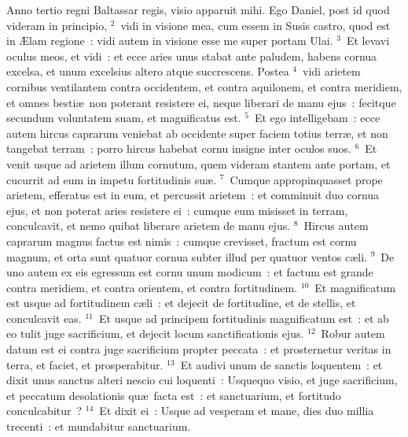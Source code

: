 \bchapter
\lettrine[lines=3,image=true,loversize=0.05,lraise=-0.03]{A}{}nno tertio regni Baltassar regis, visio apparuit mihi. Ego Daniel, post id quod videram in principio,
${}^{2}$~vidi in visione mea, cum essem in Susis castro, quod est in \AE lam regione~: vidi autem in visione esse me super portam Ulai.
${}^{3}$~Et levavi oculus meos, et vidi~: et ecce aries unus stabat ante paludem, habens cornua excelsa, et unum excelsius altero atque succrescens. Postea
${}^{4}$~vidi arietem cornibus ventilantem contra occidentem, et contra aquilonem, et contra meridiem, et omnes besti\ae\ non poterant resistere ei, neque liberari de manu ejus~: fecitque secundum voluntatem suam, et magnificatus est.
${}^{5}$~Et ego intelligebam~: ecce autem hircus caprarum veniebat ab occidente super faciem totius terr\ae , et non tangebat terram~: porro hircus habebat cornu insigne inter oculos suos.
${}^{6}$~Et venit usque ad arietem illum cornutum, quem videram stantem ante portam, et cucurrit ad eum in impetu fortitudinis su\ae .
${}^{7}$~Cumque appropinquasset prope arietem, efferatus est in eum, et percussit arietem~: et comminuit duo cornua ejus, et non poterat aries resistere ei~: cumque eum misisset in terram, conculcavit, et nemo quibat liberare arietem de manu ejus.
${}^{8}$~Hircus autem caprarum magnus factus est nimis~: cumque crevisset, fractum est cornu magnum, et orta sunt quatuor cornua subter illud per quatuor ventos c\ae li.
${}^{9}$~De uno autem ex eis egressum est cornu unum modicum~: et factum est grande contra meridiem, et contra orientem, et contra fortitudinem.
${}^{10}$~Et magnificatum est usque ad fortitudinem c\ae li~: et dejecit de fortitudine, et de stellis, et conculcavit eas.
${}^{11}$~Et usque ad principem fortitudinis magnificatum est~: et ab eo tulit juge sacrificium, et dejecit locum sanctificationis ejus.
${}^{12}$~Robur autem datum est ei contra juge sacrificium propter peccata~: et prosternetur veritas in terra, et faciet, et prosperabitur.
${}^{13}$~Et audivi unum de sanctis loquentem~: et dixit unus sanctus alteri nescio cui loquenti~: Usquequo visio, et juge sacrificium, et peccatum desolationis qu\ae\ facta est~: et sanctuarium, et fortitudo conculcabitur~?
${}^{14}$~Et dixit ei~: Usque ad vesperam et mane, dies duo millia trecenti~: et mundabitur sanctuarium.


